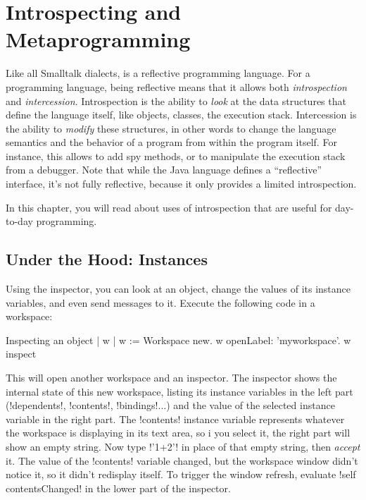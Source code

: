 \documentclass[a4paper,10pt,twoside]{book}
\begin{document}
	\renewcommand{\nnbb}[2]{} %
	\sloppy
\fi
\chapter{Introspecting and Metaprogramming}\label{cha:metaprog}

Like all Smalltalk dialects, \sq is a reflective programming language.
For a programming language, being reflective means that it allows both \emph{introspection} and \emph{intercession}.
Introspection is the ability to \emph{look} at the data structures that define the language itself, like objects, classes, the execution stack.
Intercession is the ability to \emph{modify} these structures, in other words to change the language semantics and the behavior of a program from within the program itself.
For instance, this allows to add spy methods, or to manipulate the execution stack from a debugger.
Note that while the Java language defines a ``reflective'' interface, it's not fully reflective, because it only provides a limited introspection.

In this chapter, you will read about uses of introspection that are useful for day-to-day programming.


\section{Under the Hood: Instances} %

Using the inspector, you can look at an object, change the values of its instance variables, and even send messages to it. Execute the following code in a workspace:
\begin{script}[inspectobject]{Inspecting an object}
| w |
w := Workspace new.
w openLabel: 'myworkspace'.
w inspect
\end{script}

This will open another workspace and an inspector.
The inspector shows the internal state of this new workspace, listing its instance variables in the left part (\ct!dependents!, \ct!contents!, \ct!bindings!...) and the value of the selected instance variable in the right part.
The \ct!contents! instance variable represents whatever the workspace is displaying in its text area, so i you select it, the right part will show an empty string.
Now type \ct!'1+2'! in place of that empty string, then \emph{accept} it.
The value of the \ct!contents! variable changed, but the workspace window didn't notice it, so it didn't redisplay itself.
To trigger the window refresh, evaluate \ct!self contentsChanged! in the lower part of the inspector. 
\end{document}
